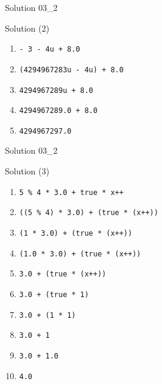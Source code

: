 \ifnum\conditionmacro=1 \documentclass[handout,usenames,dvipsnames]{beamer}\fi
\begin{document}
\begin{frame}[fragile]{Solution 03\_2}
\begin{block}{Solution (2)}
\begin{enumerate}
\item \verb,- 3 - 4u + 8.0,
\item<2-> \verb,(4294967283u - 4u) + 8.0,
\item<3-> \verb,4294967289u + 8.0,
\item<4-> \verb,4294967289.0 + 8.0,
\item<5-> \verb,4294967297.0,
\end{enumerate}
\end{block}
\end{frame}

\begin{frame}[fragile]{Solution 03\_2}
\begin{block}{Solution (3)}
\begin{enumerate}
\item \verb,5 % 4 * 3.0 + true * x++,
\item<2-> \verb,((5 % 4) * 3.0) + (true * (x++)),
\item<3-> \verb,(1 * 3.0) + (true * (x++)),
\item<4-> \verb,(1.0 * 3.0) + (true * (x++)),
\item<5-> \verb,3.0 + (true * (x++)),
\item<6-> \verb,3.0 + (true * 1),
\item<7-> \verb,3.0 + (1 * 1),
\item<8-> \verb,3.0 + 1,
\item<9-> \verb,3.0 + 1.0,
\item<10-> \verb,4.0,
\end{enumerate}
\end{block}
\end{frame}
\end{document}
